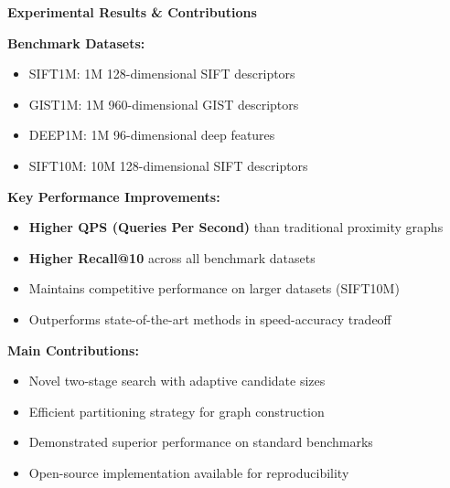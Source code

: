 \begin{frame}
\begin{center}
\Large \textbf{Experimental Results \& Contributions}
\end{center}

\vspace{0.3cm}

\textbf{Benchmark Datasets:}
\begin{itemize}
    \item SIFT1M: 1M 128-dimensional SIFT descriptors
    \item GIST1M: 1M 960-dimensional GIST descriptors
    \item DEEP1M: 1M 96-dimensional deep features
    \item SIFT10M: 10M 128-dimensional SIFT descriptors
\end{itemize}

\vspace{0.3cm}

\textbf{Key Performance Improvements:}

\begin{itemize}
    \item \textbf{Higher QPS (Queries Per Second)} than traditional proximity graphs
    \item \textbf{Higher Recall@10} across all benchmark datasets
    \item Maintains competitive performance on larger datasets (SIFT10M)
    \item Outperforms state-of-the-art methods in speed-accuracy tradeoff
\end{itemize}

\vspace{0.3cm}

\textbf{Main Contributions:}
\begin{itemize}
    \item Novel two-stage search with adaptive candidate sizes
    \item Efficient partitioning strategy for graph construction
    \item Demonstrated superior performance on standard benchmarks
    \item Open-source implementation available for reproducibility
\end{itemize}
\end{frame}%
